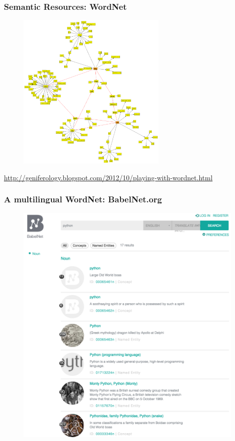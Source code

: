 \begin{frame}
\frametitle{Semantic Resources: WordNet}

\begin{figure}
\centering
\includegraphics[width=0.65\textwidth]{figures/wordnet-big}
\label{fig:wordnet}
\end{figure}

{\footnotesize \url{http://geniferology.blogspot.com/2012/10/playing-with-wordnet.html}}
\end{frame}





\begin{frame}
\frametitle{A multilingual WordNet: BabelNet.org}

\begin{figure}
\centering
\includegraphics[height=0.7\textwidth]{./figures/babelnet1}
\end{figure}

\end{frame}




